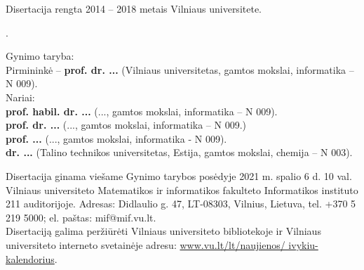 \begin{singlespace}
\noindent\nohyphens{Disertacija rengta 2014 -- 2018 metais Vilniaus universitete.}
\vspace{1cm}

.

\vspace{2cm}
\noindent
Gynimo taryba:  \\
{Pirmininkė --} {{\bf prof. dr. ...} (Vilniaus universitetas, gamtos mokslai, informatika -- N 009).\\}
Nariai:\\ %
{\bf prof. habil. dr. ...}
(..., gamtos mokslai, informatika -- N 009).\\
{\bf prof. dr. ...}
(..., gamtos mokslai, informatika – N 009.)\\
{\bf prof. ...}
(..., gamtos mokslai, informatika - N 009).\\
{\bf dr. ...}
(Talino technikos universitetas, Estija, gamtos mokslai, chemija -- N 003).



\vspace{2cm}
\noindent
Disertacija ginama viešame Gynimo tarybos posėdyje 2021 m. spalio 6 d. 10 val. Vilniaus universiteto Matematikos ir informatikos fakulteto Informatikos instituto 211 auditorijoje. Adresas: Didlaulio g. 47, LT-08303, Vilnius, Lietuva, tel. +370 5 219 5000; el. paštas: mif@mif.vu.lt.\\

\vspace{1cm}
\noindent
Disertaciją galima peržiūrėti Vilniaus universiteto bibliotekoje ir Vilniaus universiteto interneto svetainėje adresu: \href{ www.vu.lt/lt/naujienos/ivykiu-kalendorius}{ www.vu.lt/lt/naujienos/ ivykiu-kalendorius}. 



\end{singlespace}

